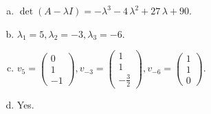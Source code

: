\begin{questions}
\begin{solution}
\begin{enumerate}[(a)]
\item $\det(A-\lambda I)=-{\lambda}^{3} - 4 \, {\lambda}^{2} + 27 \, {\lambda} + 90$.
\item ${\lambda}_1=5, {\lambda}_2=-3, {\lambda}_3=-6$.
\item $v_{5}=\left(\begin{array}{r}
0 \\
1 \\
-1
\end{array}\right), v_{-3}=\left(\begin{array}{r}
1 \\
1 \\
-\frac{3}{2}
\end{array}\right), v_{-6}=\left(\begin{array}{r}
1 \\
1 \\
0
\end{array}\right)$.
\item Yes.
\end{enumerate}
\end{solution}

\end{questions}

\newpage


\begin{center}
\end{center}

